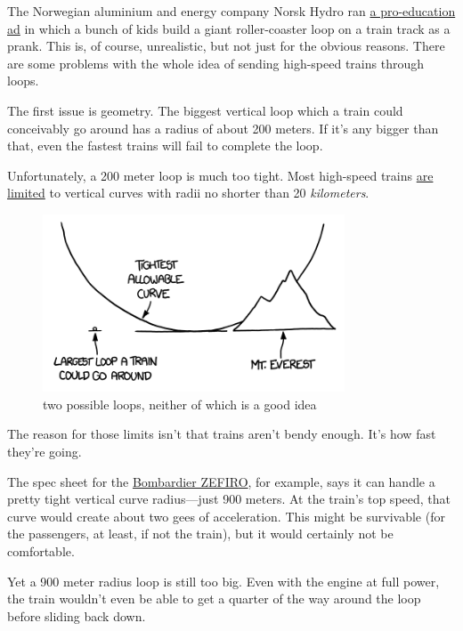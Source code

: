 {The Norwegian aluminium and energy company Norsk Hydro ran \href{http://www.youtube.com/watch?v=hlczxXqez-Y}{a pro-education ad} in which a bunch of kids build a giant roller-coaster loop on a train track as a prank. This is, of course, unrealistic, but not just for the obvious reasons. There are some problems with the whole idea of sending high-speed trains through loops.}

{The first issue is geometry. The biggest vertical loop which a train could conceivably go around has a radius of about 200 meters. If it’s any bigger than that, even the fastest trains will fail to complete the loop.}

{Unfortunately, a 200 meter loop is much too tight. Most high-speed trains \href{http://khsrcl.com/downloads/Chapter\%204.pdf}{are limited} to vertical curves with radii no shorter than 20 \emph{kilometers}.}

\begin{figure}[!htbp]
\centering
\includegraphics[scale=0.5, max width=0.8\textwidth]{imgs/a/43/train_loop_comparison.png}
\caption{two possible loops, neither of which is a good idea}
\end{figure}

{The reason for those limits isn't that trains aren't bendy enough. It's how fast they're going.}

{The spec sheet for the \href{http://www.superscooper.com/en/1\_0/pdf/Bombardier\_Zefiro\_Technical\_Description\_en.pdf}{Bombardier ZEFIRO}, for example, says it can handle a pretty tight vertical curve radius—just 900 meters. At the train’s top speed, that curve would create about two gees of acceleration. This might be survivable (for the passengers, at least, if not the train), but it would certainly not be comfortable.}

{Yet a 900 meter radius loop is still too big. Even with the engine at full power, the train wouldn’t even be able to get a quarter of the way around the loop before sliding back down.}

